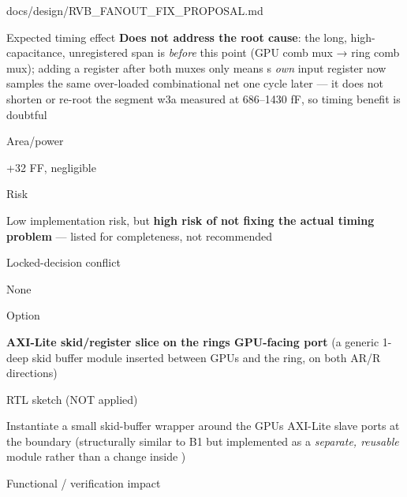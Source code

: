 \begin{relocated}{docs/design/RVB_FANOUT_FIX_PROPOSAL.md}
\begin{rowtable}
\begin{rowcell}{Expected timing effect}
\textbf{Does not address the root cause}: the long, high-capacitance,
unregistered span is \emph{before} this point (GPU comb mux → ring comb
mux); adding a register after both muxes only means
\textquotesingle s \emph{own} input register now
samples the same over-loaded combinational net one cycle later --- it
does not shorten or re-root the segment w3a measured at 686--1430 fF, so
timing benefit is doubtful

\end{rowcell}

\begin{rowcell}{Area/\allowbreak{}power}

+32 FF, negligible

\end{rowcell}

\begin{rowcell}{Risk}

Low implementation risk, but \textbf{high risk of not fixing the actual
timing problem} --- listed for completeness, not recommended

\end{rowcell}

\begin{rowcell}{Locked-decision conflict}

None

\end{rowcell}


\begin{rowcell}{Option}

\textbf{AXI-Lite skid/\allowbreak{}register slice on the
ring\textquotesingle s GPU-facing port} (a generic 1-deep skid buffer
module inserted between GPU\textquotesingle s  and the
ring, on both AR/R directions)

\end{rowcell}

\begin{rowcell}{RTL sketch (NOT applied)}

Instantiate a small skid-buffer wrapper around the GPU\textquotesingle s
AXI-Lite slave ports at the  boundary (structurally
similar to B1 but implemented as a \emph{separate, reusable} module
rather than a change inside )

\end{rowcell}

\begin{rowcell}{Functional / verification impact}


\end{rowcell}
\end{rowtable}
\end{relocated}
